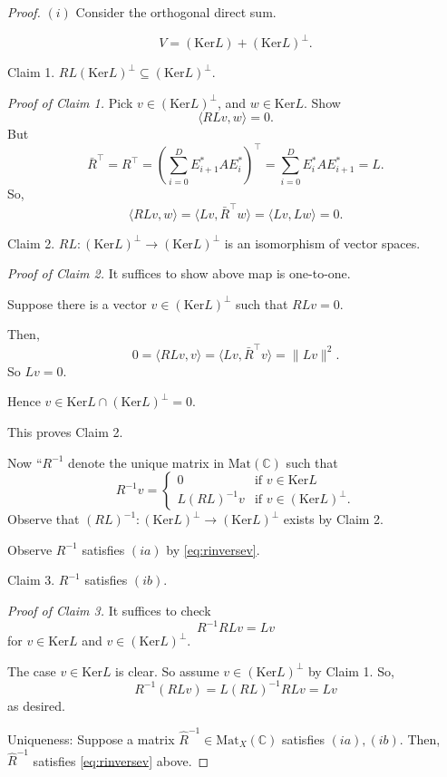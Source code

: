 \documentclass[
]{book}
\theoremstyle{definition}
\theoremstyle{definition}
\theoremstyle{definition}
\theoremstyle{definition}
\theoremstyle{remark}
\begin{document}
\begin{proof}
\leavevmode

\((i)\) Consider the orthogonal direct sum.

\[V = (\mathrm{Ker}L) + (\mathrm{Ker}L)^\bot.\]

Claim 1. \(RL(\mathrm{Ker}L)^\bot \subseteq (\mathrm{Ker}L)^\bot\).

\emph{Proof of Claim 1.}
Pick \(v\in (\mathrm{Ker}L)^\bot\), and \(w\in \mathrm{Ker}L\). Show
\[\langle RLv, w\rangle = 0.\]
But
\[\bar{R}^\top = R^\top = \left(\sum_{i=0}^D E^*_{i+1}AE^*_i\right)^\top = \sum_{i=0}^D E^*_iAE^*_{i+1} = L.\]
So,
\[\langle RLv, w\rangle = \langle Lv, \bar{R}^\top w\rangle = \langle Lv, Lw\rangle = 0.\]

\hfill\break
Claim 2. \(RL: (\mathrm{Ker}L)^\bot \to (\mathrm{Ker}L)^\bot\) is an isomorphism of vector spaces.

\emph{Proof of Claim 2.}
It suffices to show above map is one-to-one.

Suppose there is a vector \(v\in (\mathrm{Ker}L)^\bot\) such that \(RLv = 0\).

Then,
\[0 = \langle RLv , v\rangle = \langle Lv, \bar{R}^\top v\rangle = \|Lv\|^2.\]
So \(Lv = 0\).

Hence \(v\in \mathrm{Ker}L \cap (\mathrm{Ker}L)^\bot = 0\).

This proves Claim 2.

Now ``\(R^{-1}\) denote the unique matrix in \(\mathrm{Mat}(\mathbb{C})\) such that
\begin{equation}
R^{-1}v = \begin{cases}
0 & \text{if } v\in \mathrm{Ker}L \\
L(RL)^{-1}v & \text{if } v\in (\mathrm{Ker}L)^\bot.
\end{cases}\label{eq:rinversev}
\end{equation}
Observe that \((RL)^{-1}:(\mathrm{Ker}L)^\bot \to (\mathrm{Ker}L)^\bot\) exists by Claim 2.

Observe \(R^{-1}\) satisfies \((ia)\) by \eqref{eq:rinversev}.

Claim 3. \(R^{-1}\) satisfies \((ib)\).

\emph{Proof of Claim 3.}
It suffices to check
\[R^{-1}RLv = Lv\]
for \(v\in \mathrm{Ker}L\) and \(v\in (\mathrm{Ker}L)^\bot\).

The case \(v\in \mathrm{Ker}L\) is clear. So assume \(v\in (\mathrm{Ker}L)^\bot\) by Claim 1.
So,
\[R^{-1}(RLv) = L(RL)^{-1}RLv = Lv\]
as desired.

Uniqueness:
Suppose a matrix \(\hat{R}^{-1}\in \mathrm{Mat}_X(\mathbb{C})\) satisfies \((ia), (ib)\). Then, \(\hat{R}^{-1}\) satisfies \eqref{eq:rinversev} above.


\end{proof}
\end{document}

